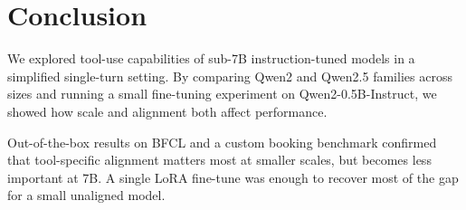 \documentclass[12pt]{extarticle}
\begin{document}
\section{Conclusion}

We explored tool-use capabilities of sub-7B instruction-tuned models in a simplified single-turn setting. By comparing Qwen2 and Qwen2.5 families across sizes and running a small fine-tuning experiment on Qwen2-0.5B-Instruct, we showed how scale and alignment both affect performance.

Out-of-the-box results on BFCL and a custom booking benchmark confirmed that tool-specific alignment matters most at smaller scales, but becomes less important at 7B. A single LoRA fine-tune was enough to recover most of the gap for a small unaligned model.



\end{document}

